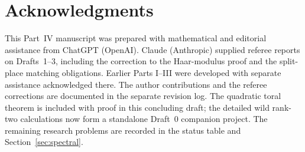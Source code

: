 \documentclass[11pt]{article}
\theoremstyle{plain}
\theoremstyle{definition}
\begin{document}
\section*{Acknowledgments}
This Part~IV manuscript was prepared with mathematical and editorial
assistance from ChatGPT (OpenAI).  Claude (Anthropic) supplied
referee reports on Drafts~1--3, including the correction to the
Haar-modulus proof and the split-place matching obligations.  Earlier Parts I--III were developed
with separate assistance acknowledged there.  The author contributions and the referee corrections are documented
in the separate revision log.  The quadratic toral theorem is included with proof in this
concluding draft; the detailed wild rank-two calculations now form
a standalone Draft~0 companion project.  The remaining research problems are
recorded in the status table and Section~\ref{sec:spectral}.
\end{document}
